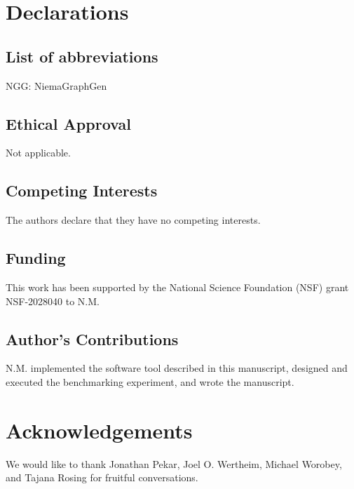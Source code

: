 \documentclass[a4paper,num-refs,gigabyte]{oup-contemporary}
\begin{document}
\section{Declarations}

\subsection{List of abbreviations}
NGG: NiemaGraphGen

\subsection{Ethical Approval}
Not applicable.

\subsection{Competing Interests}

The authors declare that they have no competing interests.

\subsection{Funding}

This work has been supported by the National Science Foundation (NSF) grant NSF-2028040 to N.M.


\subsection{Author's Contributions}

N.M. implemented the software tool described in this manuscript, designed and executed the benchmarking experiment, and wrote the manuscript.

\section{Acknowledgements}

We would like to thank Jonathan Pekar, Joel O. Wertheim, Michael Worobey, and Tajana Rosing for fruitful conversations.


\end{document}
